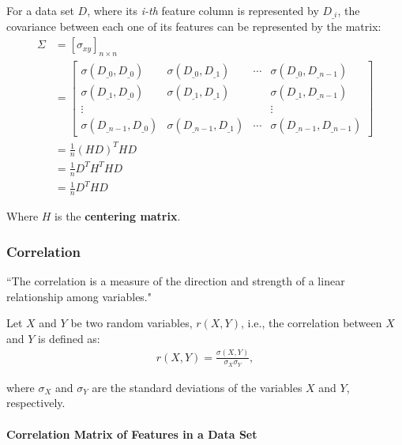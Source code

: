 \documentclass[12pt]{article}
\begin{document}
For a data set $D$, where its {\em i-th} feature column is represented by $D_{\_i}$, the covariance between each one of its features can be represented by the matrix:
\begin{align*}
\Sigma &= [\sigma_{xy}]_{n \times n} \\
&= \begin{bmatrix}
\sigma(D_{\_0}, D_{\_0}) & \sigma(D_{\_0}, D_{\_1}) & \cdots & \sigma(D_{\_0}, D_{\_n-1}) \\
\sigma(D_{\_1}, D_{\_0}) & \sigma(D_{\_1}, D_{\_1}) & & \sigma(D_{\_1}, D_{\_n-1}) \\
\vdots &&& \vdots \\
\sigma(D_{\_n-1}, D_{\_0}) & \sigma(D_{\_n-1}, D_{\_1}) & \cdots & \sigma(D_{\_n-1}, D_{\_n-1})
\end{bmatrix} \\
&= \frac{1}{n} (HD)^T HD \\
&= \frac{1}{n} D^T H^T H D \\
 &= \frac{1}{n} D^T H D
\end{align*}

Where $H$ is the \textbf{centering matrix}.

\subsubsection{Correlation}

``The correlation is a measure of the direction and strength of a linear relationship among variables."

Let $X$ and $Y$ be two random variables, $r(X, Y)$, i.e., the correlation between $X$ and $Y$ is defined as:
\begin{align*}
	r(X, Y) = \frac{\sigma(X, Y)}{\sigma_X \sigma_Y},
\end{align*}

where $\sigma_X$ and $\sigma_Y$ are the standard deviations of the variables $X$ and $Y$, respectively.

\paragraph{Correlation Matrix of Features in a Data Set}
\end{document}
